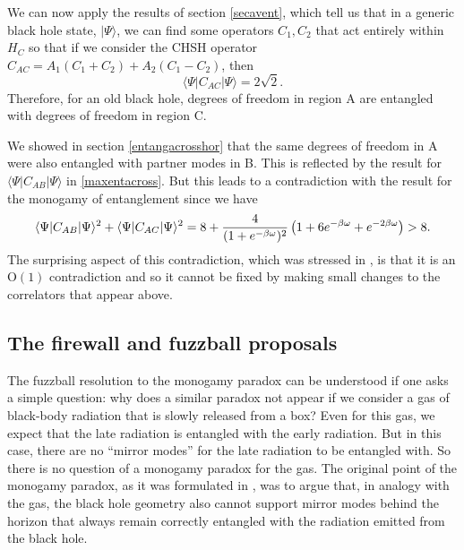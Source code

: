 \documentclass[12pt]{article}
\def\Or[#1]{{\text{O}}\left({#1}\right)}
\newcommand{\be}{\begin{equation}}
\newcommand{\ee}{\end{equation}}
\begin{document}
We can now apply the results of section \ref{secavent}, which tell us that in a generic black hole state, $|\Psi \rangle$, we can find some operators $C_1, C_2$ that act entirely within $H_C$
so that if we consider the CHSH operator $C_{AC} = A_1 (C_1 + C_2) + A_2(C_1 - C_2)$, then
\be
\langle \Psi | C_{AC} | \Psi \rangle = 2 \sqrt{2}.
\ee
Therefore, for an old black hole, degrees of freedom in region A are entangled with degrees of freedom in region C.


We showed in section \ref{entangacrosshor} that the same degrees of freedom in A were also entangled with partner modes in B. This is reflected by the result for $\langle \Psi | C_{AB} | \Psi \rangle$ in  \eqref{maxentacross}. But this leads to a contradiction with the result for the monogamy of entanglement since we have
\be
\langle \Psi | C_{AB} | \Psi \rangle^2 + \langle \Psi | C_{AC} | \Psi \rangle^2 = 8 + {4 \over (1 + e^{-\beta \omega})^2} \left(1 + 6 e^{-{\beta \omega}} + e^{-2{\beta \omega}} \right) > 8.
\ee
The surprising aspect of this contradiction, which was stressed in \cite{Mathur:2009hf}, is that it is an $\Or[1]$ contradiction and so it cannot be fixed by making small changes to the correlators that appear above.




































\subsection{The firewall and fuzzball proposals}

The fuzzball resolution to the monogamy paradox can be understood if one asks a simple question: why does a similar paradox not appear if we consider a gas of black-body radiation that is slowly released from a box?  Even for this gas, we expect that the late radiation is entangled with the early radiation. But in this case, there are no ``mirror modes'' for the late radiation to be entangled with. So there is no question of a monogamy paradox for the gas. The original point of the  monogamy paradox, as it  was formulated in \cite{Mathur:2009hf}, was to argue that, in analogy with the gas, the black hole geometry also cannot support mirror modes behind the horizon that always remain correctly entangled with the
radiation emitted from the black hole.
\end{document}
